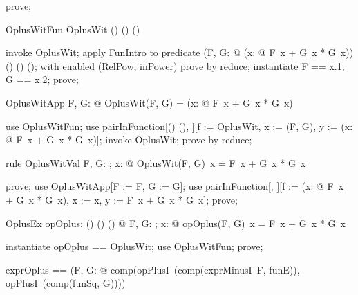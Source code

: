 \documentclass{article}
\begin{document}
\begin{zproof}
prove;
\end{zproof}

\begin{theorem}{OplusWitFun}
  OplusWit \in (\nat \fun \nat) \cross (\nat \fun \nat) \fun (\nat \fun \nat)
\end{theorem}

\begin{zproof}
invoke OplusWit;
apply FunIntro to predicate (\lambda F, G: \nat \fun \nat @ (\lambda x: \nat @ F~x + G~x * G~x)) \in (\nat \fun \nat) \cross (\nat \fun \nat) \fun (\nat \fun \nat);
with enabled (RelPow, inPower) prove by reduce;
instantiate F == x.1, G == x.2;
prove;
\end{zproof}

\begin{theorem}{OplusWitApp}
  \forall F, G: \nat \fun \nat @ OplusWit(F, G) = (\lambda x: \nat @ F~x + G~x * G~x)
\end{theorem}

\begin{zproof}
use OplusWitFun;
use pairInFunction[(\nat \fun \nat) \cross (\nat \fun \nat), \nat \fun \nat][f := OplusWit, x := (F, G), y := (\lambda x: \nat @ F~x + G~x * G~x)];
invoke OplusWit;
prove by reduce;
\end{zproof}

\begin{theorem}{rule OplusWitVal}
  \forall F, G: \nat \fun \nat; x: \nat @ OplusWit(F, G)~x = F~x + G~x * G~x
\end{theorem}

\begin{zproof}
prove;
use OplusWitApp[F := F, G := G];
use pairInFunction[\nat, \nat][f := (\lambda x: \nat @ F~x + G~x * G~x), x := x, y := F~x + G~x * G~x];
prove;
\end{zproof}

\begin{theorem}{OplusEx}
  \exists opOplus: (\nat \fun \nat) \cross (\nat \fun \nat) \fun (\nat \fun \nat) @ \forall F, G: \nat \fun \nat; x: \nat @ opOplus(F, G)~x = F~x + G~x * G~x
\end{theorem}

\begin{zproof}
instantiate opOplus == OplusWit;
use OplusWitFun;
prove;
\end{zproof}

\begin{zed}
  exprOplus == (\lambda F, G: \nat \fun \nat @ comp(opPlusI~(comp(exprMinusI~F, funE)), opPlusI~(comp(funSq, G))))
\end{zed}
\end{document}
